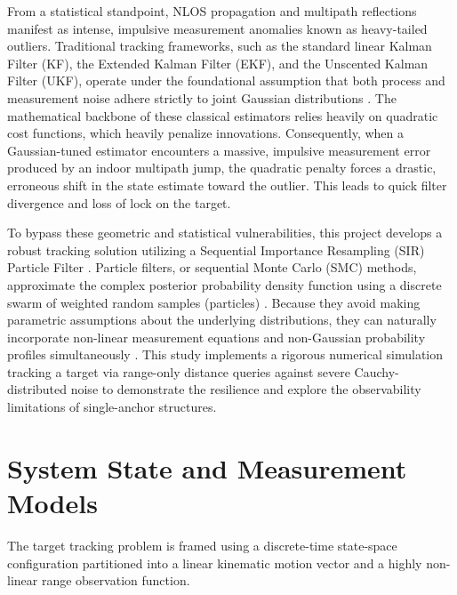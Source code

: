 \documentclass[10pt,twocolumn,a4paper]{article}
\begin{document}
From a statistical standpoint, NLOS propagation and multipath reflections manifest as intense, impulsive measurement anomalies known as heavy-tailed outliers. Traditional tracking frameworks, such as the standard linear Kalman Filter (KF), the Extended Kalman Filter (EKF), and the Unscented Kalman Filter (UKF), operate under the foundational assumption that both process and measurement noise adhere strictly to joint Gaussian distributions \cite{ristic2003beyond}. The mathematical backbone of these classical estimators relies heavily on quadratic cost functions, which heavily penalize innovations. Consequently, when a Gaussian-tuned estimator encounters a massive, impulsive measurement error produced by an indoor multipath jump, the quadratic penalty forces a drastic, erroneous shift in the state estimate toward the outlier. This leads to quick filter divergence and loss of lock on the target.

To bypass these geometric and statistical vulnerabilities, this project develops a robust tracking solution utilizing a Sequential Importance Resampling (SIR) Particle Filter \cite{gustafsson2002particle}. Particle filters, or sequential Monte Carlo (SMC) methods, approximate the complex posterior probability density function using a discrete swarm of weighted random samples (particles) \cite{djuric2003particle}. Because they avoid making parametric assumptions about the underlying distributions, they can naturally incorporate non-linear measurement equations and non-Gaussian probability profiles simultaneously \cite{arulampalam2002tutorial}. This study implements a rigorous numerical simulation tracking a target via range-only distance queries against severe Cauchy-distributed noise to demonstrate the resilience and explore the observability limitations of single-anchor structures.

\section{System State and Measurement Models}
The target tracking problem is framed using a discrete-time state-space configuration partitioned into a linear kinematic motion vector and a highly non-linear range observation function.
\end{document}
